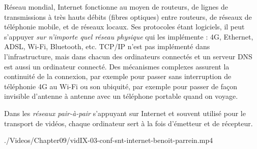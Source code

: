 \begin{tcolorbox}[title={Machines}, toprule=0pt, leftrule=0pt, rightrule=0pt, arc=0pt,
                  fonttitle=\scshape\boxtitlefont,
                  colbacktitle=white, coltitle=firstcolor, colframe=firstcolor, colback=firstcolor!10,
                  breakable, enhanced jigsaw]
Réseau mondial, Internet fonctionne au moyen de routeurs, de lignes de transmissions à très hauts débits (fibres optiques) entre routeurs, de réseaux de téléphonie mobile, et de réseaux locaux. Ses protocoles étant logiciels, il peut s’appuyer \emph{sur n’importe quel réseau physique} qui les implémente : 4G, Ethernet, ADSL, Wi-Fi, Bluetooth, etc. TCP/IP n’est pas implémenté dans l’infrastructure, mais dans chacun des ordinateurs connectés et un serveur DNS est aussi un ordinateur connecté. Des mécanismes complexes assurent la continuité de la connexion, par exemple pour passer sans interruption de téléphonie 4G au Wi-Fi ou son ubiquité, par exemple pour passer de façon invisible d’antenne à antenne avec un téléphone portable quand on voyage.

Dans les \emph{réseaux pair-à-pair} s’appuyant sur Internet et souvent utilisé pour le transport de vidéos, chaque ordinateur sert à la fois d’émetteur et de récepteur.
\end{tcolorbox}


\begin{marginvideo}
		{./Videos/Chapter09/vidIX-03-conf-snt-internet-benoit-parrein.mp4}%
\end{marginvideo}

